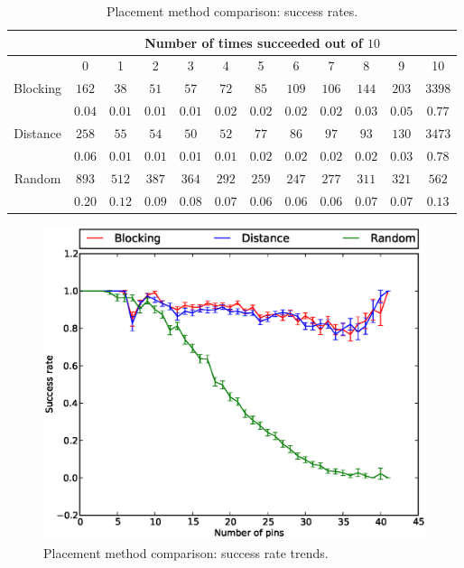 \begin{table}[H]
\begin{center}
\begin{singlespace}
\begin{tabular}{|c||c|c|c|c|c|c|c|c|c|c|c|}
\hline
 & \multicolumn{11}{|c|}{Number of times succeeded out of $10$} \\
\hline
 & 0 & 1 & 2 & 3 & 4 & 5 & 6 & 7 & 8 & 9 & 10 \\
\hline\hline
Blocking & $162$ & $38$ & $51$ & $57$ & $72$ & $85$ & $109$ & $106$ & $144$ & $203$ & $3398$ \\
 & $0.04$ & $0.01$ & $0.01$ & $0.01$ & $0.02$ & $0.02$ & $0.02$ & $0.02$ & $0.03$ & $0.05$ & $0.77$ \\
\hline
 Distance & $258$ & $55$ & $54$ & $50$ & $52$ & $77$ & $86$ & $97$ & $93$ & $130$ & $3473$ \\
  & $0.06$ & $0.01$ & $0.01$ & $0.01$ & $0.01$ & $0.02$ & $0.02$ & $0.02$ & $0.02$ & $0.03$ & $0.78$ \\
\hline
  Random & $893$ & $512$ & $387$ & $364$ & $292$ & $259$ & $247$ & $277$ & $311$ & $321$ & $562$ \\
   & $0.20$ & $0.12$ & $0.09$ & $0.08$ & $0.07$ & $0.06$ & $0.06$ & $0.06$ & $0.07$ & $0.07$ & $0.13$ \\
\hline
\end{tabular}
\end{singlespace}
\end{center}
\label{tb:placement_success}
\caption{Placement method comparison: success rates.}
\end{table}

\begin{figure}[H]
\begin{center}
\includegraphics[width=\textwidth]{Images/placement_success_trend_comparison.eps}
\caption{Placement method comparison: success rate trends.}
\label{fig:placement_success_trend}
\end{center}
\end{figure}

